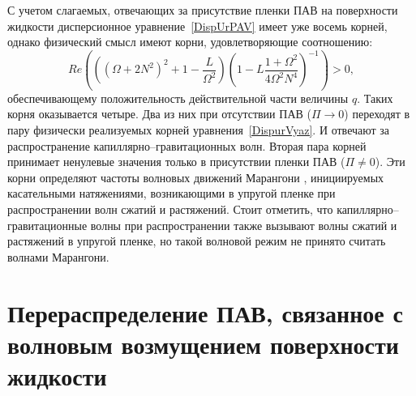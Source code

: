 С учетом слагаемых, отвечающих за присутствие пленки ПАВ на поверхности жидкости дисперсионное уравнение~\eqref{DispUrPAV} имеет уже восемь корней, однако физический смысл имеют корни, удовлетворяющие соотношению:
\begin{equation*}
Re \left( \left( \left( \Omega + 2 N^{2} \right)^{2} + 1 - \dfrac{L}{\Omega^{2}}\right) \left( 1- L \dfrac{1+\Omega^{2}}{4 \Omega^{2}N^{4}}\right)^{-1}\right) >0,
\end{equation*}
обеспечивающему положительность действительной части величины $ q $. Таких корня оказывается четыре. Два из них при отсутствии ПАВ ($ \Pi \rightarrow 0 $) переходят в пару физически реализуемых корней уравнения~\eqref{DispurVyaz}. И отвечают за распространение капиллярно--гравитационных волн. Вторая пара корней принимает ненулевые значения только в присутствии пленки ПАВ ($ \Pi \neq 0 $). Эти корни определяют частоты волновых движений Марангони \parencite{BelonozhkoGrig2004}, инициируемых касательными натяжениями, возникающими в упругой пленке при распространении волн сжатий и растяжений. Стоит отметить, что капиллярно--гравитационные волны при распространении также вызывают волны сжатий и растяжений в упругой пленке, но такой волновой режим не принято считать волнами Марангони.


\section{Перераспределение ПАВ, связанное с волновым возмущением поверхности жидкости}


